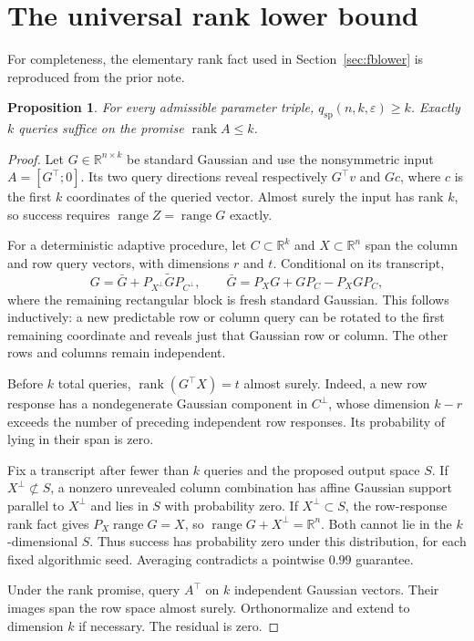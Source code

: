 \documentclass[11pt]{article}
\newtheorem{proposition}[theorem]{Proposition}
\theoremstyle{definition}
\newcommand{\R}{\mathbb R}
\newcommand{\ran}{\operatorname{range}}
\newcommand{\qsp}{q_{\mathrm{sp}}}
\begin{document}
\section{The universal rank lower bound}\label{app:rank}
For completeness, the elementary rank fact used in Section~\ref{sec:fblower} is reproduced from the prior note.
\begin{proposition}\label{prop:rank}
For every admissible parameter triple, $\qsp(n,k,\varepsilon)\ge k$. Exactly $k$ queries suffice on the promise $\operatorname{rank}A\le k$.
\end{proposition}
\begin{proof}
Let $G\in\R^{n\times k}$ be standard Gaussian and use the nonsymmetric input $A=[G^\top;0]$. Its two query directions reveal respectively $G^\top v$ and $Gc$, where $c$ is the first $k$ coordinates of the queried vector. Almost surely the input has rank $k$, so success requires $\ran Z=\ran G$ exactly.

For a deterministic adaptive procedure, let $C\subset\R^k$ and $X\subset\R^n$ span the column and row query vectors, with dimensions $r$ and $t$. Conditional on its transcript,
\[
G=\bar G+P_{X^\perp}\widetilde G P_{C^\perp},
\qquad
\bar G=P_XG+GP_C-P_XGP_C,
\]
where the remaining rectangular block is fresh standard Gaussian. This follows inductively: a new predictable row or column query can be rotated to the first remaining coordinate and reveals just that Gaussian row or column. The other rows and columns remain independent.

Before $k$ total queries, $\operatorname{rank}(G^\top X)=t$ almost surely. Indeed, a new row response has a nondegenerate Gaussian component in $C^\perp$, whose dimension $k-r$ exceeds the number of preceding independent row responses. Its probability of lying in their span is zero.

Fix a transcript after fewer than $k$ queries and the proposed output space $S$. If $X^\perp\not\subset S$, a nonzero unrevealed column combination has affine Gaussian support parallel to $X^\perp$ and lies in $S$ with probability zero. If $X^\perp\subset S$, the row-response rank fact gives $P_X\ran G=X$, so $\ran G+X^\perp=\R^n$. Both cannot lie in the $k$-dimensional $S$. Thus success has probability zero under this distribution, for each fixed algorithmic seed. Averaging contradicts a pointwise $0.99$ guarantee.

Under the rank promise, query $A^\top$ on $k$ independent Gaussian vectors. Their images span the row space almost surely. Orthonormalize and extend to dimension $k$ if necessary. The residual is zero.
\end{proof}
\end{document}
